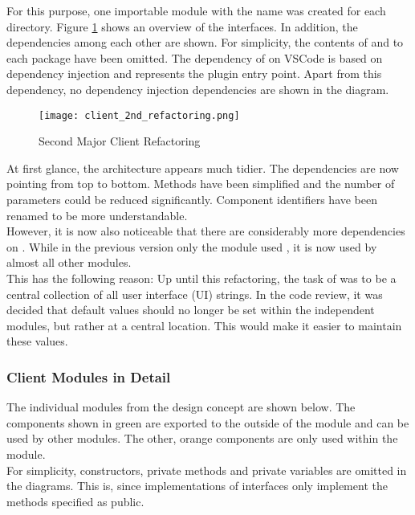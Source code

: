For this purpose, one importable module with the name  was created for each directory.
Figure \ref{fig:client_2nd_refactoring} shows an overview of the interfaces.
In addition, the dependencies among each other are shown.
For simplicity, the contents of  and  to each package have been omitted.
The dependency of  on VSCode is based on dependency injection and represents the plugin entry point.
Apart from this dependency, no dependency injection dependencies are shown in the diagram. \\

\begin{figure}[H]
    \centering
    \texttt{[image: client\_2nd\_refactoring.png]}
    \caption{Second Major Client Refactoring}
    \label{fig:client_2nd_refactoring}
\end{figure}

At first glance, the architecture appears much tidier.
The dependencies are now pointing from top to bottom.
Methods have been simplified and the number of parameters could be reduced significantly.
Component identifiers have been renamed to be more understandable. \\

However, it is now also noticeable that there are considerably more dependencies on .
While in the previous version only the module  used , it is now used by almost all other modules.\\

This has the following reason: Up until this refactoring, the task of  was to be a central collection of all user interface (UI) strings. 
In the code review, it was decided that default values should no longer be set within the independent modules,
but rather at a central location.
This would make it easier to maintain these values.

\subsubsection{Client Modules in Detail}
The individual modules from the design concept are shown below.
The components shown in green are exported to the outside of the module and can be used by other modules.
The other, orange components are only used within the module. \\

For simplicity, constructors, private methods and private variables are omitted in the diagrams.
This is, since implementations of interfaces only implement the methods specified as public. \\

